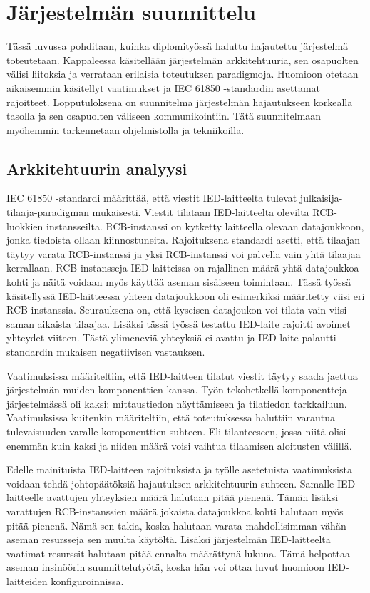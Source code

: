 \chapter{Järjestelmän suunnittelu}
Tässä luvussa pohditaan, kuinka diplomityössä haluttu hajautettu järjestelmä toteutetaan. Kappaleessa käsitellään järjestelmän arkkitehtuuria, sen osapuolten välisi liitoksia ja verrataan erilaisia toteutuksen paradigmoja. Huomioon otetaan aikaisemmin käsitellyt vaatimukset ja IEC 61850 -standardin asettamat rajoitteet. Lopputuloksena on suunnitelma järjestelmän hajautukseen korkealla tasolla ja sen osapuolten väliseen kommunikointiin. Tätä suunnitelmaan myöhemmin tarkennetaan ohjelmistolla ja tekniikoilla.


\section{Arkkitehtuurin analyysi}
\label{ch:architecture-analysis}
IEC 61850 -standardi määrittää, että viestit IED-laitteelta tulevat julkaisija-tilaaja-pa\-ra\-dig\-man mukaisesti. Viestit tilataan IED-laitteelta olevilta RCB-luokkien instansseilta. RCB-instanssi on kytketty laitteella olevaan datajoukkoon, jonka tiedoista ollaan kiinnostuneita. Rajoituksena standardi asetti, että tilaajan täytyy varata RCB-instanssi ja yksi RCB-instanssi voi palvella vain yhtä tilaajaa kerrallaan. RCB-instansseja IED-laitteissa on rajallinen määrä yhtä datajoukkoa kohti ja näitä voidaan myös käyttää aseman sisäiseen toimintaan. Tässä työssä käsitellyssä IED-laitteessa yhteen datajoukkoon oli esimerkiksi määritetty viisi eri RCB-instanssia. Seurauksena on, että kyseisen datajoukon voi tilata vain viisi saman aikaista tilaajaa. Lisäksi tässä työssä testattu IED-laite rajoitti avoimet yhteydet viiteen. Tästä ylimeneviä yhteyksiä ei avattu ja IED-laite palautti standardin mukaisen negatiivisen vastauksen.


Vaatimuksissa määriteltiin, että IED-laitteen tilatut viestit täytyy saada jaettua järjestelmän muiden komponenttien kanssa. Työn tekohetkellä komponentteja järjestelmässä oli kaksi: mittaustiedon näyttämiseen ja tilatiedon tarkkailuun. Vaatimuksissa kuitenkin määriteltiin, että toteutuksessa haluttiin varautua tulevaisuuden varalle komponenttien suhteen. Eli tilanteeseen, jossa niitä olisi enemmän kuin kaksi ja niiden määrä voisi vaihtua tilaamisen aloitusten välillä.

Edelle mainituista IED-laitteen rajoituksista ja työlle asetetuista vaatimuksista voidaan tehdä johtopäätöksiä hajautuksen arkkitehtuurin suhteen. Samalle IED-laitteelle avattujen yhteyksien määrä halutaan pitää pienenä. Tämän lisäksi varattujen RCB-instanssien määrä jokaista datajoukkoa kohti halutaan myös pitää pienenä. Nämä sen takia, koska halutaan varata mahdollisimman vähän aseman resursseja sen muulta käytöltä. Lisäksi järjestelmän IED-laitteelta vaatimat resurssit halutaan pitää ennalta määrättynä lukuna. Tämä helpottaa aseman insinöörin suunnittelutyötä, koska hän voi ottaa luvut huomioon IED-laitteiden konfiguroinnissa.

